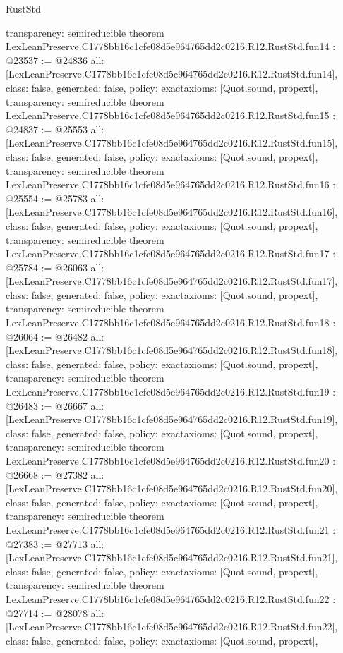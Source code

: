 \begin{lexlean}{RustStd}
\begin{coremodule}
{  transparency: semireducible
}
theorem LexLeanPreserve.C1778bb16c1cfe08d5e964765dd2c0216.R12.RustStd.fun14 : @23537 := @24836 {
  all: [LexLeanPreserve.C1778bb16c1cfe08d5e964765dd2c0216.R12.RustStd.fun14],
  class: false,
  generated: false,
  policy: exact{axioms: [Quot.sound, propext]},
  transparency: semireducible
}
theorem LexLeanPreserve.C1778bb16c1cfe08d5e964765dd2c0216.R12.RustStd.fun15 : @24837 := @25553 {
  all: [LexLeanPreserve.C1778bb16c1cfe08d5e964765dd2c0216.R12.RustStd.fun15],
  class: false,
  generated: false,
  policy: exact{axioms: [Quot.sound, propext]},
  transparency: semireducible
}
theorem LexLeanPreserve.C1778bb16c1cfe08d5e964765dd2c0216.R12.RustStd.fun16 : @25554 := @25783 {
  all: [LexLeanPreserve.C1778bb16c1cfe08d5e964765dd2c0216.R12.RustStd.fun16],
  class: false,
  generated: false,
  policy: exact{axioms: [Quot.sound, propext]},
  transparency: semireducible
}
theorem LexLeanPreserve.C1778bb16c1cfe08d5e964765dd2c0216.R12.RustStd.fun17 : @25784 := @26063 {
  all: [LexLeanPreserve.C1778bb16c1cfe08d5e964765dd2c0216.R12.RustStd.fun17],
  class: false,
  generated: false,
  policy: exact{axioms: [Quot.sound, propext]},
  transparency: semireducible
}
theorem LexLeanPreserve.C1778bb16c1cfe08d5e964765dd2c0216.R12.RustStd.fun18 : @26064 := @26482 {
  all: [LexLeanPreserve.C1778bb16c1cfe08d5e964765dd2c0216.R12.RustStd.fun18],
  class: false,
  generated: false,
  policy: exact{axioms: [Quot.sound, propext]},
  transparency: semireducible
}
theorem LexLeanPreserve.C1778bb16c1cfe08d5e964765dd2c0216.R12.RustStd.fun19 : @26483 := @26667 {
  all: [LexLeanPreserve.C1778bb16c1cfe08d5e964765dd2c0216.R12.RustStd.fun19],
  class: false,
  generated: false,
  policy: exact{axioms: [Quot.sound, propext]},
  transparency: semireducible
}
theorem LexLeanPreserve.C1778bb16c1cfe08d5e964765dd2c0216.R12.RustStd.fun20 : @26668 := @27382 {
  all: [LexLeanPreserve.C1778bb16c1cfe08d5e964765dd2c0216.R12.RustStd.fun20],
  class: false,
  generated: false,
  policy: exact{axioms: [Quot.sound, propext]},
  transparency: semireducible
}
theorem LexLeanPreserve.C1778bb16c1cfe08d5e964765dd2c0216.R12.RustStd.fun21 : @27383 := @27713 {
  all: [LexLeanPreserve.C1778bb16c1cfe08d5e964765dd2c0216.R12.RustStd.fun21],
  class: false,
  generated: false,
  policy: exact{axioms: [Quot.sound, propext]},
  transparency: semireducible
}
theorem LexLeanPreserve.C1778bb16c1cfe08d5e964765dd2c0216.R12.RustStd.fun22 : @27714 := @28078 {
  all: [LexLeanPreserve.C1778bb16c1cfe08d5e964765dd2c0216.R12.RustStd.fun22],
  class: false,
  generated: false,
  policy: exact{axioms: [Quot.sound, propext]},
}
\end{coremodule}
\end{lexlean}
